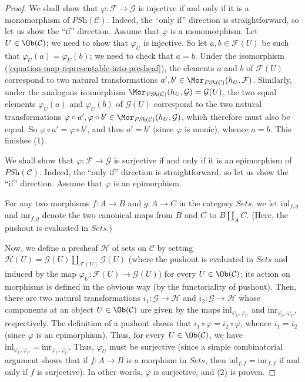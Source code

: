 \begin{proof}
We shall show that $\varphi : \mathcal{F} \to
\mathcal{G}$ is injective if and only if it is a monomorphism
of $\textit{PSh}(\mathcal{C})$. Indeed, the ``only if''
direction is straightforward, so let us show the ``if''
direction. Assume that $\varphi$ is a monomorphism. Let
$U \in \Ob(\mathcal{C})$; we need to show that $\varphi_U$ is
injective. So let $a, b \in \mathcal{F}(U)$ be such that
$\varphi_U (a) = \varphi_U (b)$; we need to check that $a = b$.
Under the isomorphism
(\ref{equation-map-representable-into-presheaf}), the elements
$a$ and $b$ of $\mathcal{F}(U)$ correspond to two natural
transformations
$a', b' \in \Mor_{\textit{PSh}(\mathcal{C})}(h_U, \mathcal{F})$.
Similarly, under the analogous isomorphism
$\Mor_{\textit{PSh}(\mathcal{C})}(h_U, \mathcal{G})
= \mathcal{G}(U)$,
the two equal elements $\varphi_U (a)$ and $\varphi_U (b)$ of
$\mathcal{G}(U)$ correspond to the two natural transformations
$\varphi \circ a', \varphi \circ b'
\in \Mor_{\textit{PSh}(\mathcal{C})}(h_U, \mathcal{G})$,
which therefore must also be equal. So
$\varphi \circ a' = \varphi \circ b'$, and thus $a' = b'$
(since $\varphi$ is monic), whence $a = b$. This finishes (1).

\medskip\noindent
We shall show that $\varphi : \mathcal{F} \to
\mathcal{G}$ is surjective if and only if it is an epimorphism
of $\textit{PSh}(\mathcal{C})$. Indeed, the ``only if''
direction is straightforward, so let us show the ``if''
direction. Assume that $\varphi$ is an epimorphism.

\medskip\noindent
For any two morphisms $f : A \to B$ and $g : A \to C$ in the
category $\textit{Sets}$, we let $\text{inl}_{f,g}$ and
$\text{inr}_{f,g}$ denote the two canonical maps from
$B$ and $C$ to $B \coprod_A C$. (Here, the pushout is
evaluated in $\textit{Sets}$.)

\medskip\noindent
Now, we define a presheaf $\mathcal{H}$ of sets on $\mathcal{C}$
by setting $\mathcal{H}(U)
= \mathcal{G}(U) \coprod_{\mathcal{F}(U)} \mathcal{G}(U)$ (where
the pushout is evaluated in $\textit{Sets}$ and induced by
the map $\varphi_U : \mathcal{F}(U) \to \mathcal{G}(U)$) for
every $U \in \Ob(\mathcal{C})$; its action on morphisms is
defined in the obvious way (by the functoriality of pushout).
Then, there are two natural
transformations $i_1 : \mathcal{G} \to \mathcal{H}$ and
$i_2 : \mathcal{G} \to \mathcal{H}$ whose components at an object
$U \in \Ob(\mathcal{C})$ are given by the maps
$\text{inl}_{\varphi_U, \varphi_U}$ and
$\text{inr}_{\varphi_U, \varphi_U}$, respectively. The
definition of a pushout shows that $i_1 \circ \varphi
= i_2 \circ \varphi$, whence $i_1 = i_2$ (since $\varphi$ is an
epimorphism). Thus, for every $U \in \Ob(\mathcal{C})$, we have
$\text{inl}_{\varphi_U, \varphi_U}
= \text{inr}_{\varphi_U, \varphi_U}$. Thus, $\varphi_U$
must be surjective (since a simple combinatorial argument shows
that if $f : A \to B$ is a morphism in $\textit{Sets}$, then
$\text{inl}_{f,f} = \text{inr}_{f,f}$ if and
only if $f$ is surjective). In other words, $\varphi$ is
surjective, and (2) is proven.


\end{proof}

